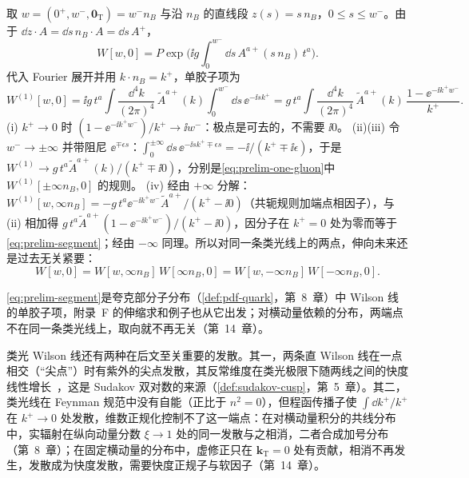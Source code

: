 \begin{example}[有限类光线段的单胶子项]\label{ex:prelim-wilson-segment}
取 $w=(0^+,w^-,\mathbf 0_{\mathrm T})=w^-n_B$ 与沿 $n_B$ 的直线段 $z(s)=s\,n_B$，$0\le s\le w^-$。由于 $\dd z\cdot A=\dd s\,n_B\cdot A=\dd s\,A^+$，
\[
W[w,0]=P\exp\Big(\ii g\int_0^{w^-}\dd s\,A^{a+}(s\,n_B)\,t^a\Big).
\]
代入 Fourier 展开并用 $k\cdot n_B=k^+$，单胶子项为
\begin{equation}\label{eq:prelim-segment}
W^{(1)}[w,0]=\ii g\,t^a\!\int\!\frac{\dd^4k}{(2\pi)^4}\,\tilde A^{a+}(k)\int_0^{w^-}\!\dd s\,\ee^{-\ii sk^+}=g\,t^a\!\int\!\frac{\dd^4k}{(2\pi)^4}\,\tilde A^{a+}(k)\,\frac{1-\ee^{-\ii k^+w^-}}{k^+}.
\end{equation}
(i) $k^+\to0$ 时 $(1-\ee^{-\ii k^+w^-})/k^+\to\ii w^-$：极点是可去的，不需要 $\ii0$。
(ii)(iii) 令 $w^-\to\pm\infty$ 并带阻尼 $\ee^{\mp\epsilon s}$：$\int_0^{\pm\infty}\dd s\,\ee^{-\ii sk^+\mp\epsilon s}=-\ii/(k^+\mp\ii\epsilon)$，于是 $W^{(1)}\to g\,t^a\tilde A^{a+}(k)/(k^+\mp\ii0)$，分别是\cref{eq:prelim-one-gluon}中 $W^{(1)}[\pm\infty n_B,0]$ 的规则。
(iv) 经由 $+\infty$ 分解：$W^{(1)}[w,\infty n_B]=-g\,t^a\ee^{-\ii k^+w^-}\tilde A^{a+}/(k^+-\ii0)$（共轭规则加端点相因子），与 (ii) 相加得 $g\,t^a\tilde A^{a+}(1-\ee^{-\ii k^+w^-})/(k^+-\ii0)$，因分子在 $k^+=0$ 处为零而等于\cref{eq:prelim-segment}；经由 $-\infty$ 同理。所以对同一条类光线上的两点，伸向未来还是过去无关紧要：
\[
W[w,0]=W[w,\infty n_B]\,W[\infty n_B,0]=W[w,-\infty n_B]\,W[-\infty n_B,0].
\]
\end{example}

\cref{eq:prelim-segment}是夸克部分子分布（\cref{def:pdf-quark}，第~8~章）中 Wilson 线的单胶子项，附录~F 的伸缩求和例子也从它出发；对横动量依赖的分布，两端点不在同一条类光线上，取向就不再无关（第~14~章）。

类光 Wilson 线还有两种在后文至关重要的发散。其一，两条直 Wilson 线在一点相交（“尖点”）时有紫外的尖点发散，其反常维度在类光极限下随两线之间的快度线性增长~\cite{Polyakov1980,BrandtNeriSato1981,KorchemskyRadyushkin1987}，这是 Sudakov 双对数的来源（\cref{def:sudakov-cusp}，第~5~章）。其二，类光线在 Feynman 规范中没有自能（正比于 $n^2=0$），但程函传播子使 $\int\dd k^+/k^+$ 在 $k^+\to0$ 处发散，维数正规化控制不了这一端点：在对横动量积分的共线分布中，实辐射在纵向动量分数 $\xi\to1$ 处的同一发散与之相消，二者合成加号分布（第~8~章）；在固定横动量的分布中，虚修正只在 $\mathbf k_{\mathrm T}=0$ 处有贡献，相消不再发生，发散成为快度发散，需要快度正规子与软因子（第~14~章）。
